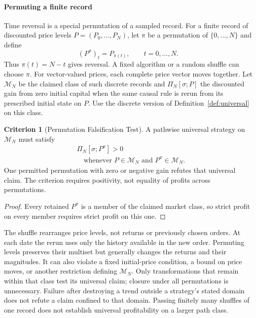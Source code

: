 \documentclass[aps,pra,reprint,superscriptaddress,amsmath,amssymb,floatfix]{revtex4-2}
\theoremstyle{plain}
\theoremstyle{definition}
\newtheorem{criterion}{Criterion}
\theoremstyle{remark}
\begin{document}
\paragraph{Permuting a finite record}

Time reversal is a special permutation of a sampled record. For a finite
record of discounted price levels \(P=(P_0,\ldots,P_N)\), let \(\pi\) be
a permutation of \(\{0,\ldots,N\}\) and define
\begin{equation}
  (P^\pi)_t=P_{\pi(t)},\qquad t=0,\ldots,N.
  \label{eq:price-permutation}
\end{equation}
Thus \(\pi(t)=N-t\) gives reversal. A fixed algorithm or a random shuffle
can choose \(\pi\). For vector-valued prices, each complete price vector
moves together. Let \(\mathcal M_N\) be the claimed class of such discrete
records and \(\Pi_N[\sigma;P]\) the discounted gain from zero initial capital
when the same causal rule is rerun from its prescribed initial state on \(P\).
Use the discrete version of Definition~\ref{def:universal} on this class.

\begin{criterion}[Permutation Falsification Test]
  \label{crit:permutation}
  A pathwise universal strategy on \(\mathcal M_N\) must satisfy
  \begin{equation}
    \begin{aligned}
      &\Pi_N[\sigma;P^\pi]>0\\
      &\quad\text{whenever }P\in\mathcal M_N\text{ and }P^\pi\in\mathcal M_N.
    \end{aligned}
    \label{eq:permutationtest}
  \end{equation}
  One permitted permutation with zero or negative gain refutes that universal
  claim. The criterion requires positivity, not equality of profits across
  permutations.
\end{criterion}

\begin{proof}
Every retained \(P^\pi\) is a member of the claimed market class, so strict
profit on every member requires strict profit on this one.
\end{proof}

The shuffle rearranges price levels, not returns or previously chosen orders.
At each date the rerun uses only the history available in the new order.
Permuting levels preserves their multiset but generally changes the returns
and their magnitudes. It can also violate a fixed initial-price condition,
a bound on price moves, or another restriction defining \(\mathcal M_N\).
Only transformations that remain within that class test its universal claim;
closure under all permutations is unnecessary. Failure after destroying a
trend outside a strategy's stated domain does not refute a claim confined to
that domain. Passing finitely many shuffles of one record does not establish
universal profitability on a larger path class.
\end{document}
